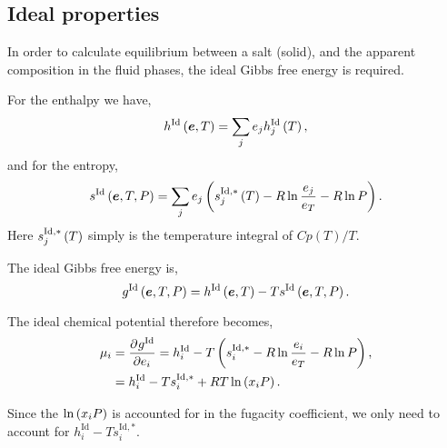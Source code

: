 \documentclass[internal,english]{sintefmemo2012}
\newcommand*{\pd}[3][]{\frac{\partial^{#1}#2}{\partial{#3}^{#1}}}%
\newcommand*{\vektor}[1]{\boldsymbol{#1}}%
\newcommand{\lp}{\ensuremath{\left(}\xspace}
\newcommand{\rp}{\ensuremath{\right)}\xspace}
\newcommand{\ideal}{\ensuremath{\text{Id}}\xspace}
\begin{document}
\subsection{Ideal properties}
In order to calculate equilibrium between a salt (solid), and the
apparent composition in the fluid phases, the ideal Gibbs free energy
is required.

For the enthalpy we have,
\begin{equation}
  h^\ideal \lp \vektor{e},  T \rp = \sum_j e_j h_j^\ideal \lp T \rp,
\label{eq:id_enthalpy}
\end{equation}
and for the entropy,
\begin{equation}
  s^\ideal \lp \vektor{e},  T, P \rp = \sum_j e_j \lp s_j^{\ideal,*} \lp T \rp  - R \ln \frac{e_j}{e_T} - R \ln P \rp.
\label{eq:id_entropy}
\end{equation}
Here $s_j^{\ideal,*} \lp T \rp$ simply is the temperature integral of $Cp(T)/T$.

The ideal Gibbs free energy is,
\begin{equation}
  g^\ideal \lp \vektor{e},  T, P \rp = h^\ideal \lp \vektor{e},  T \rp - T s^\ideal \lp \vektor{e},  T, P \rp.
\label{eq:id_gibbs}
\end{equation}

The ideal chemical potential therefore becomes,
\begin{align}
  \mu_i &= \pd{g^\ideal}{e_i} = h^\ideal_i - T \lp s_i^{\ideal,*}  - R \ln \frac{e_i}{e_T} - R \ln P \rp, \\
  &= h^\ideal_i - T s_i^{\ideal,*}  + RT \ln \lp x_i P \rp.
\label{eq:id_chempot}
\end{align}

Since the $\ln \lp x_i P \rp$ is accounted for in the fugacity
coefficient, we only need to account for $h^\ideal_i - T
s_i^{\ideal,*}$.

\clearpage


\end{document}
